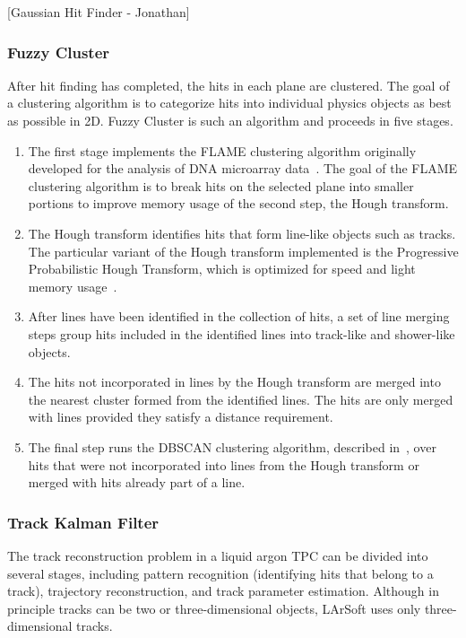 \documentclass[12pt]{elsarticle}
\newcommand{\larsoft}{LArSoft }
\begin{document}
[Gaussian Hit Finder - Jonathan]


\subsubsection{Fuzzy Cluster}

After hit finding has completed, the hits in each plane are clustered. The goal of a clustering algorithm is to categorize hits into individual physics objects as best as possible in 2D. Fuzzy Cluster is such an algorithm and proceeds in five stages.
\begin{enumerate}
\item
The first stage implements the FLAME clustering algorithm originally developed for the analysis of DNA microarray data~\cite{flame}. The goal of the FLAME clustering algorithm is to break hits on the selected plane into smaller portions to improve memory usage of the second step, the Hough transform. 
\item
The Hough transform identifies hits that form line-like objects such as tracks. The particular variant of the Hough transform implemented is the Progressive Probabilistic Hough Transform, which is optimized for speed and light memory usage~\cite{ppht}. 
\item
After lines have been identified in the collection of hits, a set of line merging steps 
group hits included in the identified lines into track-like and shower-like objects.
\item
The hits not incorporated in lines by the Hough transform are merged into the nearest cluster formed from the identified lines. The hits are only merged with lines provided they satisfy a distance requirement. 
\item
The final step runs the DBSCAN clustering algorithm, described in~\cite{dbscan}, over hits that were not incorporated into lines from the Hough transform or merged with hits already part of a line. 
\end{enumerate}


\subsubsection{Track Kalman Filter}

The track reconstruction problem in a liquid argon TPC can be
divided into several stages, including pattern recognition
(identifying hits that belong to a track), trajectory reconstruction,
and track parameter estimation. Although in principle tracks can be two or
three-dimensional objects, \larsoft uses only three-dimensional
tracks.
\end{document}
